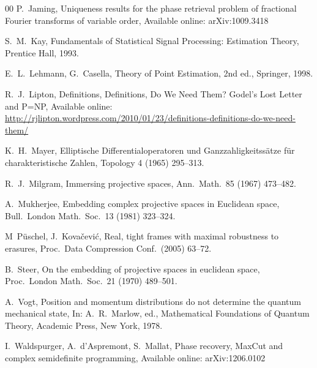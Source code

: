 \documentclass[times,10pt]{elsarticle}
\theoremstyle{plain}
\begin{document}
\begin{thebibliography}{00}
P.\ Jaming,
Uniqueness results for the phase retrieval problem of fractional Fourier transforms of variable order,
Available online: arXiv:1009.3418

S.\ M.\ Kay,
Fundamentals of Statistical Signal Processing: Estimation Theory,
Prentice Hall, 1993.

E.\ L.\ Lehmann, G.\ Casella,
Theory of Point Estimation,
2nd ed., Springer, 1998.

R.\ J.\ Lipton,
Definitions, Definitions, Do We Need Them?
Godel's Lost Letter and P=NP,
Available online: \url{http://rjlipton.wordpress.com/2010/01/23/definitions-definitions-do-we-need-them/}

K.\ H.\ Mayer,
Elliptische Differentialoperatoren und Ganzzahligkeitss\"{a}tze f\"{u}r charakteristische Zahlen,
Topology 4 (1965) 295--313.

R.\ J.\ Milgram, 
Immersing projective spaces, 
Ann.\ Math.\ 85 (1967) 473--482.

A.\ Mukherjee,
Embedding complex projective spaces in Euclidean space,
Bull.\ London Math.\ Soc.\ 13 (1981) 323--324.

M\ P\"{u}schel, J.\ Kova\v{c}evi\'{c},
Real, tight frames with maximal robustness to erasures,
Proc.\ Data Compression Conf.\ (2005) 63--72.

B.\ Steer,
On the embedding of projective spaces in euclidean space,
Proc.\ London Math.\ Soc.\ 21 (1970) 489--501.

A.\ Vogt,
Position and momentum distributions do not determine the quantum mechanical state,
In: A.\ R.\ Marlow, ed., Mathematical Foundations of Quantum Theory, Academic Press, New York, 1978.

I.\ Waldspurger, A.\ d'Aspremont, S.\ Mallat, 
Phase recovery, MaxCut and complex semidefinite programming, 
Available online: arXiv:1206.0102


\end{thebibliography}
\end{document}
